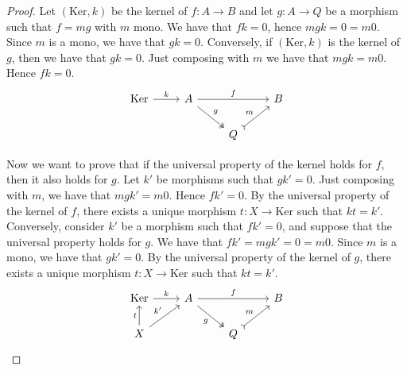 \begin{subbox}{}
    \begin{proof}
        Let $(\mathrm{Ker},k)$ be the kernel of $f: A \to B$ and let $g:A \to Q$ be a morphism such that $f=mg$ with $m$ mono. We have that $fk=0$, hence $mgk=0=m0$. Since $m$ is a mono, we have that $gk=0$. Conversely, if $(\mathrm{Ker},k)$ is the kernel of $g$, then we have that $gk=0$. Just composing with $m$ we have that $mgk=m0$. Hence $fk=0$.
        \[
\begin{tikzcd}
\mathrm{Ker} \arrow[r, "k"] & A \arrow[rr, "f"] \arrow[rd, "g", two heads] &                         & B \\
                            &                                               & Q \arrow[ru, "m", tail] &  
\end{tikzcd}
        \]
        
        Now we want to prove that if the universal property of the kernel holds for $f$, then it also holds for $g$. Let $k'$ be morphisms such that $gk'=0$. Just composing with $m$, we have that $mgk'=m0$. Hence $fk'=0$. By the universal property of the kernel of $f$, there exists a unique morphism $t: X \to \mathrm{Ker}$ such that $kt=k'$. Conversely, consider $k'$ be a morphism such that $fk'=0$, and suppose that the universal property holds for $g$. We have that $fk'=mgk'=0=m0$. Since $m$ is a mono, we have that $gk'=0$. By the universal property of the kernel of $g$, there exists a unique morphism $t: X \to \mathrm{Ker}$ such that $kt=k'$.
        \[
\begin{tikzcd}
\mathrm{Ker} \arrow[r, "k"]       & A \arrow[rr, "f"] \arrow[rd, "g"', two heads] &                         & B \\
X \arrow[ru, "k'"] \arrow[u, "t"] &                                               & Q \arrow[ru, "m", tail] &  
\end{tikzcd}
        \]

    \end{proof}
\end{subbox}